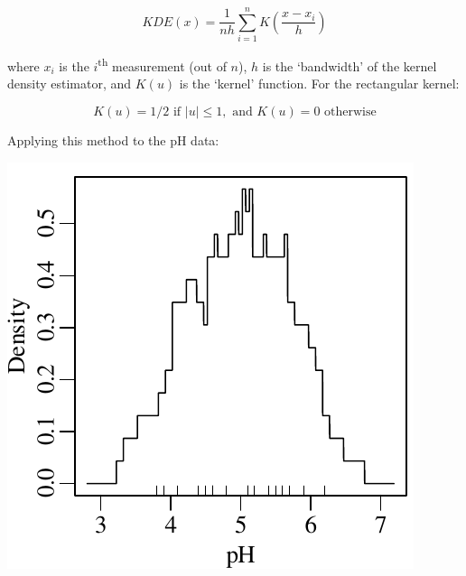 \begin{equation}
  KDE(x) = \frac{1}{nh} \sum\limits_{i=1}^{n} K\!\left(\frac{x-x_i}{h}\right)
\end{equation}

\noindent where $x_i$ is the $i$\textsuperscript{th} measurement (out
of $n$), $h$ is the `bandwidth' of the kernel density estimator, and
$K(u)$ is the `kernel' function. For the rectangular kernel:

\begin{equation}
  K(u) = 1/2 \mbox{~if~}|u| \leq 1, \mbox{~and~} K(u) = 0 \mbox{~otherwise}
\end{equation}

Applying this method to the pH data:

\noindent\begin{minipage}[t][][b]{.3\textwidth}
  \includegraphics[width=\textwidth]{../figures/pHrectKDE.pdf}\medskip
\end{minipage}
\begin{minipage}[t][][t]{.7\textwidth}
  \label{fig:pHrectKDE}
\end{minipage}

